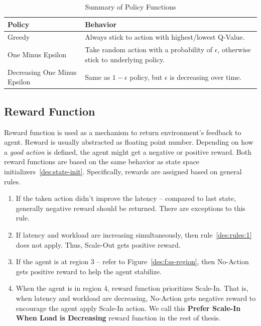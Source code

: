 \begin{table}[h]
    \begin{tabular}{ll}
        \toprule
        \textbf{Policy} & \textbf{Behavior}\\
        \midrule
        Greedy & Always stick to action with highest/lowest Q-Value.\\
        One Minus Epsilon & Take random action with a probability of $\epsilon$, otherwise stick to underlying policy. \\
        Decreasing One Minus Epsilon & Same as $1-\epsilon$ policy, but $\epsilon$ is decreasing over time.\\
        \bottomrule
    \end{tabular}
    \centering
    \caption{Summary of Policy Functions}
    \label{des:tab:policy}
\end{table}

\subsection{Reward Function}

Reward function is used as a mechanism to return environment's feedback to agent. Reward is usually abstracted as floating point number. Depending on how a \emph{good action} is defined, the agent might get a negative or positive reward. Both reward functions are based on the same behavior as state space initializers~\ref{des:state-init}. Specifically, rewards are assigned based on general rules.
\begin{enumerate}
    \item \label{des:rules:1} If the taken action didn't improve the latency -- compared to last state, generally negative reward should be returned. There are exceptions to this rule.
    \item If latency and workload are increasing simultaneously, then rule~\ref{des:rules:1} does not apply. Thus, Scale-Out gets positive reward.
    \item If the agent is at region 3 -- refer to Figure~\ref{des:f:ss-region}, then No-Action gets positive reward to help the agent stabilize.
    \item When the agent is in region 4, reward function prioritizes Scale-In. That is, when latency and workload are decreasing, No-Action gets negative reward to encourage the agent apply Scale-In action. We call this \textbf{Prefer Scale-In When Load is Decreasing} reward function in the rest of thesis.
\end{enumerate}
